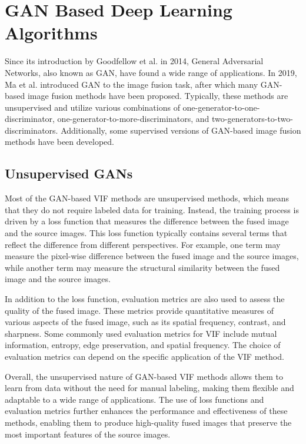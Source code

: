 \section{GAN Based Deep Learning Algorithms}

Since its introduction by Goodfellow et al. \cite{goodfellow2014generative} in 2014, General Adversarial Networks, also known as GAN, have found a wide range of applications. In 2019, Ma et al. \cite{ma2019fusiongan} introduced GAN to the image fusion task, after which many GAN-based image fusion methods have been proposed. Typically, these methods are unsupervised and utilize various combinations of one-generator-to-one-discriminator, one-generator-to-more-discriminators, and two-generators-to-two-discriminators. Additionally, some supervised versions of GAN-based image fusion methods have been developed.

\subsection{Unsupervised GANs}

Most of the GAN-based VIF methods are unsupervised methods, which means that they do not require labeled data for training. Instead, the training process is driven by a loss function that measures the difference between the fused image and the source images. This loss function typically contains several terms that reflect the difference from different perspectives. For example, one term may measure the pixel-wise difference between the fused image and the source images, while another term may measure the structural similarity between the fused image and the source images.

In addition to the loss function, evaluation metrics are also used to assess the quality of the fused image. These metrics provide quantitative measures of various aspects of the fused image, such as its spatial frequency, contrast, and sharpness. Some commonly used evaluation metrics for VIF include mutual information, entropy, edge preservation, and spatial frequency. The choice of evaluation metrics can depend on the specific application of the VIF method.

Overall, the unsupervised nature of GAN-based VIF methods allows them to learn from data without the need for manual labeling, making them flexible and adaptable to a wide range of applications. The use of loss functions and evaluation metrics further enhances the performance and effectiveness of these methods, enabling them to produce high-quality fused images that preserve the most important features of the source images.

